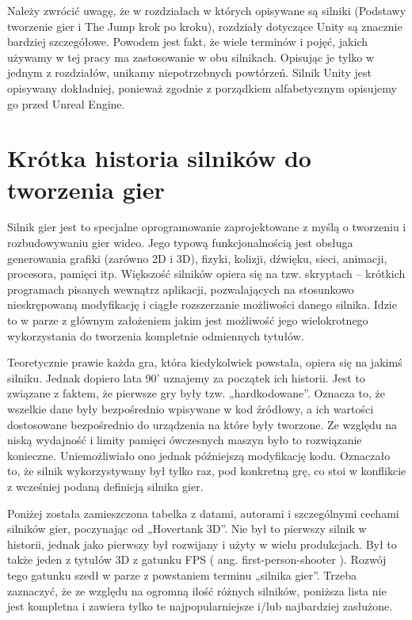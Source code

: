 \documentclass[12pt]{xmgr}
\begin{document}
Należy zwrócić uwagę, że w rozdziałach w których opisywane są silniki (Podstawy tworzenie gier i The Jump krok po kroku), rozdziały dotyczące Unity są znacznie bardziej szczegółowe. Powodem jest fakt, że wiele terminów i pojęć, jakich używamy w tej pracy ma zastosowanie w obu silnikach. Opisując je tylko w jednym z rozdziałów, unikamy niepotrzebnych powtórzeń. Silnik Unity jest opisywany dokładniej, ponieważ zgodnie z porządkiem alfabetycznym opisujemy go przed Unreal Engine.

\chapter{Krótka historia silników do tworzenia gier}

Silnik gier jest to specjalne oprogramowanie zaprojektowane z myślą o tworzeniu i rozbudowywaniu gier wideo. Jego typową funkcjonalnością jest obsługa generowania grafiki (zarówno 2D i 3D), fizyki, kolizji, dźwięku, sieci, animacji, procesora, pamięci itp. Większość silników opiera się na tzw. skryptach – krótkich programach pisanych wewnątrz aplikacji, pozwalających na stosunkowo nieskrępowaną modyfikację i ciągłe rozszerzanie możliwości danego silnika. Idzie to w parze z głównym założeniem jakim jest możliwość jego wielokrotnego wykorzystania do tworzenia kompletnie odmiennych tytułów.

Teoretycznie prawie każda gra, która kiedykolwiek powstała, opiera się na jakimś silniku. Jednak dopiero lata 90' uznajemy za początek ich historii. Jest to związane z faktem, że pierwsze gry były tzw. „hardkodowane”. Oznacza to, że wszelkie dane były bezpośrednio wpisywane w kod źródłowy, a ich wartości dostosowane bezpośrednio do urządzenia na które były tworzone. Ze względu na niską wydajność i limity pamięci ówczesnych maszyn było to rozwiązanie konieczne. Uniemożliwiało ono jednak późniejszą modyfikację kodu. Oznaczało to, że silnik wykorzystywany był tylko raz, pod konkretną grę, co stoi w konflikcie z wcześniej podaną definicją silnika gier.

Poniżej została zamieszczona tabelka z datami, autorami i szczególnymi cechami silników gier, poczynając od „Hovertank 3D”. Nie był to pierwszy silnik w historii, jednak jako pierwszy był rozwijany i użyty w wielu produkcjach. Był to także jeden z tytułów 3D z gatunku FPS ( ang. first-person-shooter ). Rozwój tego gatunku szedł w parze z powstaniem terminu „silnika gier”. Trzeba zaznaczyć, że ze względu na ogromną ilość różnych silników, poniższa lista nie jest kompletna i zawiera tylko te najpopularniejsze i/lub najbardziej zasłużone.
\end{document}
